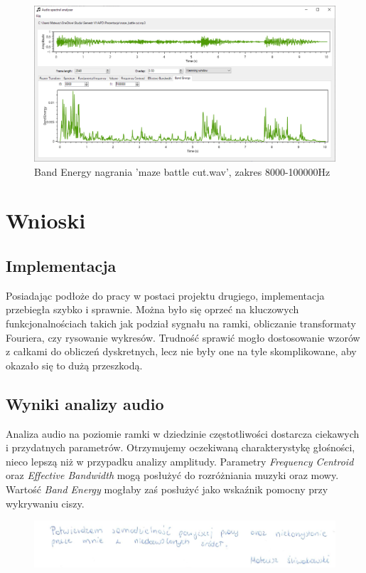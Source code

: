 \documentclass{article}
\begin{document}
\begin{figure}[H]
\includegraphics[width=6in]{scr13.png}
\centering
\caption{Band Energy nagrania 'maze battle cut.wav', zakres 8000-100000Hz}
\end{figure}

\section{Wnioski}
\subsection{Implementacja}
Posiadając podłoże do pracy w postaci projektu drugiego, implementacja przebiegła szybko i sprawnie. Można było się oprzeć na kluczowych funkcjonalnościach takich jak podział sygnału na ramki, obliczanie transformaty Fouriera, czy rysowanie wykresów. Trudność sprawić mogło dostosowanie wzorów z całkami do obliczeń dyskretnych, lecz nie były one na tyle skomplikowane, aby okazało się to dużą przeszkodą.

\subsection{Wyniki analizy audio}
Analiza audio na poziomie ramki w dziedzinie częstotliwości dostarcza ciekawych i przydatnych parametrów. Otrzymujemy oczekiwaną charakterystykę głośności, nieco lepszą niż w przypadku analizy amplitudy. Parametry \textit{Frequency Centroid} oraz \textit{Effective Bandwidth} mogą posłużyć do rozróżniania muzyki oraz mowy. Wartość \textit{Band Energy} mogłaby zaś posłużyć jako wskaźnik pomocny przy wykrywaniu ciszy.

\begin{figure}[b]
\centering
\includegraphics[width=5in]{bottom.png}
\end{figure}
\end{document}
